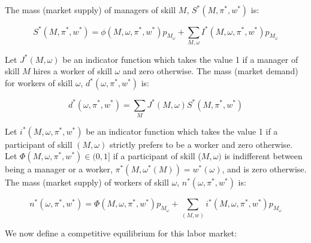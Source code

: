 \documentclass[12 pt]{article}
\begin{document}
The mass (market supply) of managers of skill $M$, $S^{\ast}(M,\pi^{\ast
},w^{\ast})$ is:%

\begin{equation}
	S^{\ast}(M,\pi^{\ast},w^{\ast})=\phi(M,\omega,\pi^{\ast},w^{\ast}%
	)p_{M_{\omega}}+\sum_{M,\omega}I^{\ast}(M,\omega,\pi^{\ast},w^{\ast
	})p_{M_{\omega}} \label{supply of managers}%
\end{equation}


Let $J^{\ast}(M,\omega)$ be an indicator function which takes the value 1 if a
manager of skill $M$ hires a worker of skill $\omega$ and zero otherwise. The
mass (market demand) for workers of skill $\omega$, $d^{\ast}(\omega,\pi
^{\ast},w^{\ast})$ is:%

\begin{equation}
	d^{\ast}(\omega,\pi^{\ast},w^{\ast})=\sum_{M}J^{\ast}(M,\omega)S^{\ast}%
	(M,\pi^{\ast},w^{\ast}) \label{demand for workers}%
\end{equation}


Let $i^{\ast}(M,\omega,\pi^{\ast},w^{\ast})$ be an indicator function which
takes the value 1 if a participant of skill $(M,\omega)$ strictly prefers to
be a worker and zero otherwise. Let $\Phi(M,\omega,\pi^{\ast},w^{\ast}%
)\in(0,1]$ if a participant of skill ($M,\omega)$ is indifferent between being
a manager or a worker, $\pi^{\ast}(M,\omega^{\ast}(M))=w^{\ast}(\omega)$, and
is zero otherwise. The mass (market supply) of workers of skill $\omega$,
$n^{\ast}(\omega,\pi^{\ast},w^{\ast})$ is:%

\begin{equation}
	n^{\ast}(\omega,\pi^{\ast},w^{\ast})=\Phi(M,\omega,\pi^{\ast},w^{\ast
	})p_{M_{\omega}}+\sum_{(M,w)}i^{\ast}(M,\omega,\pi^{\ast},w^{\ast
	})p_{M_{\omega}} \label{supply of workers}%
\end{equation}


We now define a competitive equilibrium for this labor market:
\end{document}
